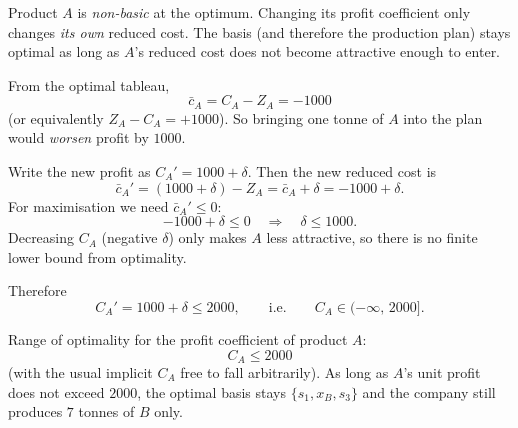 \begin{ideabox}
Product \(A\) is \emph{non-basic} at the optimum. Changing its profit coefficient only
changes \emph{its own} reduced cost. The basis (and therefore the production plan)
stays optimal as long as \(A\)'s reduced cost does not become attractive enough to enter.
\end{ideabox}

From the optimal tableau,
\[
  \bar{c}_A = C_A - Z_A = -1000
\]
(or equivalently \(Z_A-C_A=+1000\)). So bringing one tonne of \(A\) into the plan would
\emph{worsen} profit by \(1000\).

Write the new profit as \(C_A'=1000+\delta\). Then the new reduced cost is
\[
  \bar{c}_A' = (1000+\delta)-Z_A = \bar{c}_A+\delta = -1000+\delta.
\]
For maximisation we need \(\bar{c}_A'\le 0\):
\[
  -1000+\delta\le 0 \quad\Rightarrow\quad \delta\le 1000.
\]
Decreasing \(C_A\) (negative \(\delta\)) only makes \(A\) less attractive, so there is no
finite lower bound from optimality.

Therefore
\[
  C_A' = 1000+\delta \le 2000,
  \qquad\text{i.e.}\qquad
  C_A\in(-\infty,\,2000].
\]

\begin{resultbox}[title={Part (c)}]
Range of optimality for the profit coefficient of product \(A\):
\[
  \boxed{\,C_A\le 2000\,}
\]
(with the usual implicit \(C_A\) free to fall arbitrarily). As long as \(A\)'s unit profit
does not exceed \(2000\), the optimal basis stays \(\{s_1,x_B,s_3\}\) and the company
still produces \(7\) tonnes of \(B\) only.
\end{resultbox}
